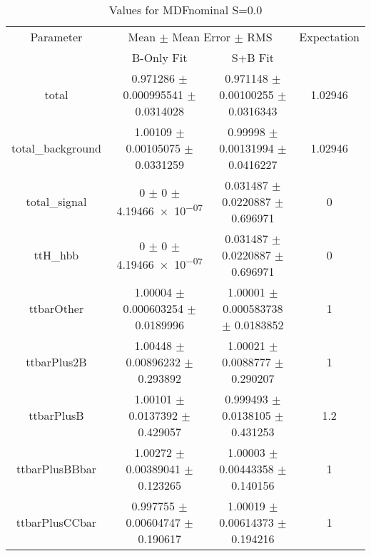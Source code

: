 \begin{table}
\centering
\caption{Values for MDFnominal S=0.0}
\begin{tabular}{cccc}
\toprule
Parameter & \multicolumn{2}{c}{Mean $\pm$ Mean Error $\pm$ RMS} & Expectation\\
 & B-Only Fit & S+B Fit & \\
\midrule
total & \num{0.971286} $\pm$ \num{0.000995541} $\pm$ \num{0.0314028} & \num{0.971148} $\pm$ \num{0.00100255} $\pm$ \num{0.0316343} & \num{1.02946}\\
total\_background & \num{1.00109} $\pm$ \num{0.00105075} $\pm$ \num{0.0331259} & \num{0.99998} $\pm$ \num{0.00131994} $\pm$ \num{0.0416227} & \num{1.02946}\\
total\_signal & \num{0} $\pm$ \num{0} $\pm$ \num{4.19466e-07} & \num{0.031487} $\pm$ \num{0.0220887} $\pm$ \num{0.696971} & \num{0}\\
ttH\_hbb & \num{0} $\pm$ \num{0} $\pm$ \num{4.19466e-07} & \num{0.031487} $\pm$ \num{0.0220887} $\pm$ \num{0.696971} & \num{0}\\
ttbarOther & \num{1.00004} $\pm$ \num{0.000603254} $\pm$ \num{0.0189996} & \num{1.00001} $\pm$ \num{0.000583738} $\pm$ \num{0.0183852} & \num{1}\\
ttbarPlus2B & \num{1.00448} $\pm$ \num{0.00896232} $\pm$ \num{0.293892} & \num{1.00021} $\pm$ \num{0.0088777} $\pm$ \num{0.290207} & \num{1}\\
ttbarPlusB & \num{1.00101} $\pm$ \num{0.0137392} $\pm$ \num{0.429057} & \num{0.999493} $\pm$ \num{0.0138105} $\pm$ \num{0.431253} & \num{1.2}\\
ttbarPlusBBbar & \num{1.00272} $\pm$ \num{0.00389041} $\pm$ \num{0.123265} & \num{1.00003} $\pm$ \num{0.00443358} $\pm$ \num{0.140156} & \num{1}\\
ttbarPlusCCbar & \num{0.997755} $\pm$ \num{0.00604747} $\pm$ \num{0.190617} & \num{1.00019} $\pm$ \num{0.00614373} $\pm$ \num{0.194216} & \num{1}\\
\bottomrule
\end{tabular}
\end{table}